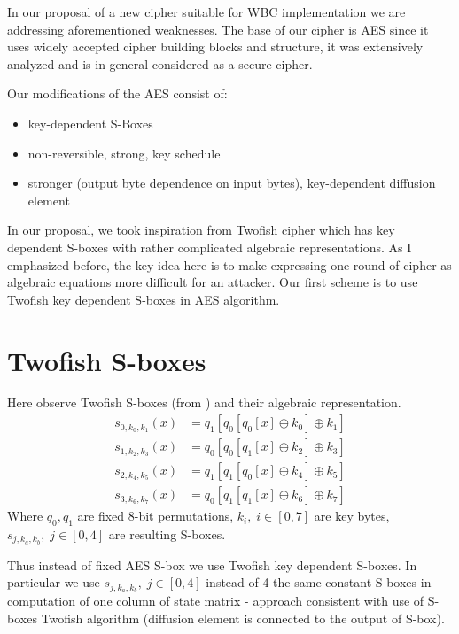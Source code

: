 \documentclass[11pt,oneside,final]{fithesis2}
\begin{document}
    In our proposal of a new cipher suitable for WBC implementation we are addressing aforementioned weaknesses. The base of our cipher is AES since it uses widely accepted
    cipher building blocks and structure, it was extensively analyzed and is in general considered as a secure cipher.
	
    Our modifications of the AES consist of:
    \begin{itemize}
     \item key-dependent S-Boxes
     \item non-reversible, strong, key schedule
     \item stronger (output byte dependence on input bytes), key-dependent diffusion element
    \end{itemize}

    In our proposal, we took inspiration from Twofish \cite{Schneier98twofish:a} cipher which has key dependent S-boxes with rather
    complicated algebraic representations. As I emphasized before, the key idea here is to make expressing one round of cipher as algebraic equations
    more difficult for an attacker. Our first scheme is to use Twofish key dependent S-boxes in AES algorithm. 

    \section{Twofish S-boxes}\label{sec:twofish_sbox}
    Here observe Twofish S-boxes (from \citep{Schneier98twofish:a}) and their algebraic representation.
    \begin{subequations}\label{eq:twofish_sbox}
    \begin{align}
	s_{0,k_0,k_1}\left(x\right) &= q_1\left[q_0\left[q_0\left[x\right] \oplus k_0 \right] \oplus k_1 \right]\\
	s_{1,k_2,k_3}\left(x\right) &= q_0\left[q_0\left[q_1\left[x\right] \oplus k_2 \right] \oplus k_3 \right]\\
	s_{2,k_4,k_5}\left(x\right) &= q_1\left[q_1\left[q_0\left[x\right] \oplus k_4 \right] \oplus k_5 \right]\\
	s_{3,k_6,k_7}\left(x\right) &= q_0\left[q_1\left[q_1\left[x\right] \oplus k_6 \right] \oplus k_7 \right]
    \end{align}
    \end{subequations}
    Where $q_0, q_1$ are fixed 8-bit permutations, $k_i,\; i \in [0,7]$ are key bytes, $s_{j,k_a,k_b},\; j \in [0,4]$ are resulting S-boxes.

    Thus instead of fixed AES S-box we use Twofish key dependent S-boxes. In particular we use $s_{j,k_a,k_b},\; j \in [0,4]$ instead of 4 the same constant
    S-boxes in computation of one column of state matrix - approach consistent with use of S-boxes Twofish algorithm (diffusion element is connected 
    to the output of S-box). 
\end{document}
